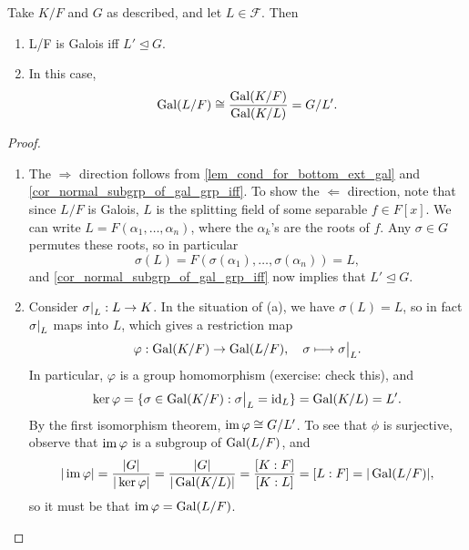 \begin{proposition}
\label{prop_addendum_fund_thm_of_gal_thy}
    Take $K/F$ and $G$ as described, and let $L \in \mathcal{F}$. Then
    \begin{enumerate}[label=(\alph*)]
        \item L/F is Galois iff $L' \unlhd G$.
        \item In this case,
        \[
            \operatorname{Gal}(L/F) \cong \frac{\operatorname{Gal}(K/F)}{\operatorname{Gal}(K/L)} = G/L'.
        \]
    \end{enumerate}
\end{proposition}

\begin{proof}~
    \begin{enumerate}[label=(\alph*)]
        \item The $\Rightarrow$ direction follows from \cref{lem_cond_for_bottom_ext_gal} and \cref{cor_normal_subgrp_of_gal_grp_iff}. To show the $\Leftarrow$ direction, note that since $L/F$ is Galois, $L$ is the splitting field of some separable $f \in F[x]$. We can write $L = F(\alpha_1, \ldots, \alpha_n)$, where the $\alpha_k$'s are the roots of $f$. Any $\sigma \in G$ permutes these roots, so in particular
        \[
            \sigma(L) = F(\sigma(\alpha_1), \ldots, \sigma(\alpha_n)) = L,
        \]
        and \cref{cor_normal_subgrp_of_gal_grp_iff} now implies that $L' \unlhd G$.

        \item Consider $\restr{\sigma}{L}: L \to K$. In the situation of (a), we have $\sigma(L) = L$, so in fact $\restr{\sigma}{L}$ maps into $L$, which gives a restriction map
        \[
            \varphi: \gal(K/F) \to \gal(L/F), \quad \sigma \longmapsto \restr{\sigma}{L}.
        \]
        In particular, $\varphi$ is a group homomorphism (exercise: check this), and
        \[
            \ker{\varphi} = \{\sigma \in \gal(K/F): \restr{\sigma}{L} = \id_L\} = \gal(K/L) = L'.
        \]
        By the first isomorphism theorem, $\operatorname{im}{\varphi} \cong G/L'$. To see that $\phi$ is surjective, observe that $\operatorname{im}{\varphi}$ is a subgroup of $\operatorname{Gal}(L/F)$, and
        \[
            |\operatorname{im}{\varphi}| = \frac{|G|}{|\ker{\varphi}|} = \frac{|G|}{|\operatorname{Gal}(K/L)|} = \frac{[K : F]}{[K : L]} = [L : F] = |\operatorname{Gal}(L/F)|,
        \]
        so it must be that $\operatorname{im}{\varphi} = \operatorname{Gal}(L/F)$.
        \qedhere
    \end{enumerate}
\end{proof}

